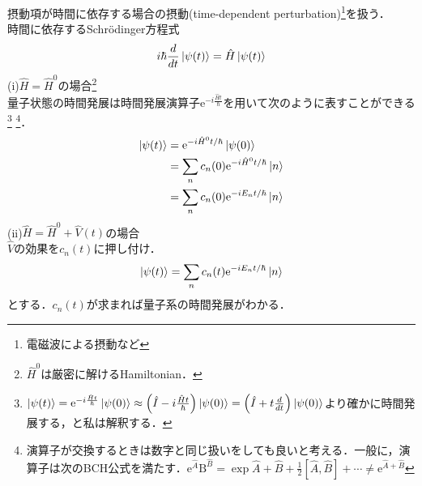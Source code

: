 \documentclass{report}
\begin{document}
  摂動項が時間に依存する場合の摂動(time-dependent perturbation)\footnote{電磁波による摂動など}を扱う．\\
  時間に依存するSchrödinger方程式
  \begin{equation}
  i\hbar\frac{d}{dt}\ket{\psi(t)}=\hat{H}\ket{\psi(t)}
  \end{equation}
  (i)$\hat{H}=\hat{H}^0$の場合\footnote{$\hat{H}^0$は厳密に解けるHamiltonian．}\\
  量子状態の時間発展は時間発展演算子$\mathrm{e}^{-i\frac{\hat{H}t}{\hbar}}$を用いて次のように表すことができる\footnote{$\ket{\psi(t)}=\mathrm{e}^{-i\frac{\hat{H}t}{\hbar}}\ket{\psi(0)}\approx\qty(\hat{I}-i\frac{\hat{H}t}{\hbar})\ket{\psi(0)}=\qty(\hat{I}+t\frac{d}{dt})\ket{\psi(0)}$より確かに時間発展する，と私は解釈する．}
  \footnote{演算子が交換するときは数字と同じ扱いをしても良いと考える．一般に，演算子は次のBCH公式を満たす．$\mathrm{e}^{\hat{A}}\mathrm{B}^{\hat{B}}=\exp{\hat{A}+\hat{B}+\frac{1}{2}[\hat{A},\hat{B}]+\cdots}\ne\mathrm{e}^{\hat{A}+\hat{B}}$}．
  \begin{align}
    \ket{\psi(t)}&=\mathrm{e}^{-i\hat{H}^0t/\hbar}\ket{\psi(0)}\\
    &=\sum_{n}c_n(0)\mathrm{e}^{-i\hat{H}^0t/\hbar}\ket{n}\\
    &=\sum_{n}c_n(0)\mathrm{e}^{-iE_nt/\hbar}\ket{n}
  \end{align}
  (ii)$\hat{H}=\hat{H}^0+\hat{V}(t)$の場合\\
  $\hat{V}$の効果を$c_n(t)$に押し付け．
  \begin{equation}
    \ket{\psi(t)}=\sum_{n}c_n(t)\mathrm{e}^{-iE_nt/\hbar}\ket{n}
  \end{equation}
  とする．$c_n(t)$が求まれば量子系の時間発展がわかる．
\end{document}
